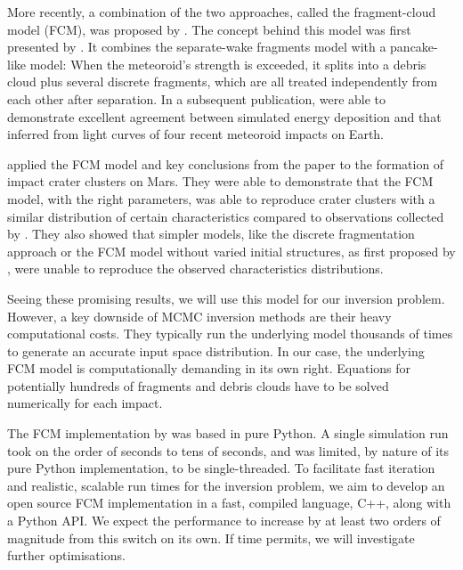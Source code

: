 More recently, a combination of the two approaches, called the fragment-cloud model (FCM), was proposed by \cite{wheeler2017fragmentcloud}.
The concept behind this model was first presented by \cite{mehta2015break}.
It combines the separate-wake fragments model \citep{passey1980effects,artemieva1996interaction} with a pancake-like model:
When the meteoroid's strength is exceeded, it splits into a debris cloud plus several discrete fragments, which are all treated independently from each other after separation.
In a subsequent publication, \cite{wheeler2018atmospheric} were able to demonstrate excellent agreement between simulated energy deposition and that inferred from light curves of four recent meteoroid impacts on Earth.

\cite{newland2019CFM18} applied the FCM model and key conclusions from the \cite{wheeler2018atmospheric} paper to the formation of impact crater clusters on Mars.
They were able to demonstrate that the FCM model, with the right parameters, was able to reproduce crater clusters with a similar distribution of certain characteristics compared to observations collected by \cite{daubar2019recently}.
They also showed that simpler models, like the discrete fragmentation approach or the FCM model without varied initial structures, as first proposed by \cite{wheeler2017fragmentcloud}, were unable to reproduce the observed characteristics distributions.

Seeing these promising results, we will use this model for our inversion problem.
However, a key downside of MCMC inversion methods are their heavy computational costs.
They typically run the underlying model thousands of times to generate an accurate input space distribution.
In our case, the underlying FCM model is computationally demanding in its own right.
Equations for potentially hundreds of fragments and debris clouds have to be solved numerically for each impact.

The FCM implementation by \cite{newland2019CFM18} was based in pure Python.
A single simulation run took on the order of seconds to tens of seconds, and was limited, by nature of its pure Python implementation, to be single-threaded.
To facilitate fast iteration and realistic, scalable run times for the inversion problem, we aim to develop an open source FCM implementation in a fast, compiled language, C++, along with a Python API.
We expect the performance to increase by at least two orders of magnitude from this switch on its own.
If time permits, we will investigate further optimisations.
